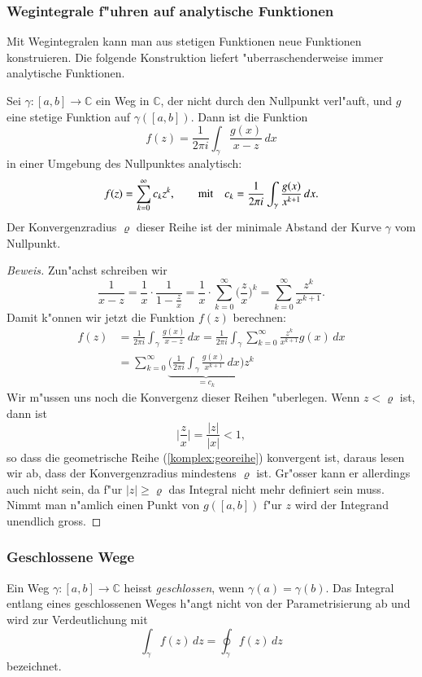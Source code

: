 %
%
\subsubsection{Wegintegrale f"uhren auf analytische Funktionen}
Mit Wegintegralen kann man aus stetigen Funktionen neue Funktionen
konstruieren.
Die folgende Konstruktion liefert "uberraschenderweise immer
analytische Funktionen.
\begin{satz}
Sei $\gamma\colon [a,b]\to\mathbb C$ ein Weg in $\mathbb C$, der nicht
durch den Nullpunkt verl"auft, und $g$ eine stetige Funktion
auf $\gamma([a,b])$.
Dann ist die Funktion
\[
f(z) = \frac1{2\pi i}\int_\gamma \frac{g(x)}{x-z}\,dx
\]
in einer Umgebung des Nullpunktes analytisch:
\[
f(z) = \sum_{k=0}^\infty c_k z^k,\qquad
\text{mit\quad}
c_k=\frac1{2\pi i}\int_\gamma \frac{g(x)}{x^{k+1}}\,dx.
\]
Der Konvergenzradius $\varrho$ dieser Reihe ist der minimale Abstand der
Kurve $\gamma$ vom Nullpunkt.
\end{satz}

\begin{proof}[Beweis]
Zun"achst schreiben wir
\begin{equation}
\frac{1}{x-z}
=
\frac1x\cdot \frac{1}{1-\textstyle\frac{z}{x}}
=
\frac1x\cdot \sum_{k=0}^\infty \biggl(\frac{z}{x}\biggr)^k
=
\sum_{k=0}^\infty \frac{z^k}{x^{k+1}}.
\label{komplex:georeihe}
\end{equation}
Damit k"onnen wir jetzt die Funktion $f(z)$ berechnen:
\begin{align*}
f(z)
&=
\frac1{2\pi i} \int_{\gamma} \frac{g(x)}{x-z}\,dx
=
\frac1{2\pi i} \int_{\gamma} \sum_{k=0}^\infty \frac{z^k}{x^{k+1}}g(x)\,dx
\\
&=
\sum_{k=0}^\infty
\underbrace{\biggl(\frac1{2\pi i} \int_{\gamma} \frac{g(x)}{x^{k+1}}\,dx\biggr)}_{\textstyle =c_k}
z^k
\end{align*}
Wir m"ussen uns noch die Konvergenz dieser Reihen "uberlegen.
Wenn $z<\varrho$ ist, dann ist 
\[
\biggl|\frac{z}{x}\biggr| 
=
\frac{|z|}{|x|}
<1,
\]
so dass die geometrische Reihe (\ref{komplex:georeihe}) konvergent ist,
daraus lesen wir ab, dass der Konvergenzradius mindestens $\varrho$
ist.
Gr"osser kann er allerdings auch nicht sein, da f"ur $|z|\ge \varrho$
das Integral nicht mehr definiert sein muss.
Nimmt man n"amlich einen Punkt von $g([a,b])$ f"ur $z$ wird der Integrand
unendlich gross.
\end{proof}

%
%
\subsubsection{Geschlossene Wege}
\begin{definition}
Ein Weg $\gamma\colon[a,b]\to\mathbb C$ heisst {\em geschlossen}, wenn
$\gamma(a)=\gamma(b)$.
Das Integral entlang eines geschlossenen Weges h"angt nicht von der
Parametrisierung ab und wird zur Verdeutlichung mit
\[
\int_{\gamma}f(z)\,dz
=
\oint_{\gamma}f(z)\,dz
\]
bezeichnet.
\end{definition}

